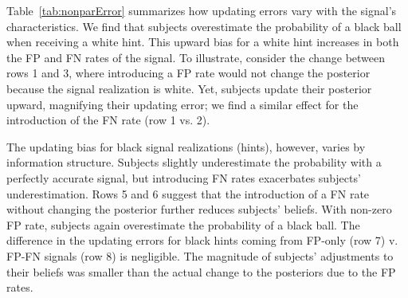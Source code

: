 \documentclass[12pt,a4paper]{article}
\begin{document}
\begin{table}[H]\centering 
\caption{Average Updating Error by Signal Type} 
\label{tab:nonparError}
\end{table}



Table~\ref{tab:nonparError} summarizes how updating errors vary with the signal's characteristics. We find that subjects overestimate the probability of a black ball when receiving a white hint. This upward bias for a white hint increases in both the FP and FN rates of the signal. To illustrate, consider the change between rows 1 and 3, where introducing a FP rate would not change the posterior because the signal realization is white. Yet, subjects update their posterior upward, magnifying their updating error; we find a similar effect for the introduction of the FN rate (row 1 vs. 2).

The updating bias for black signal realizations (hints), however, varies by information structure. Subjects slightly underestimate the probability with a perfectly accurate signal, but introducing FN rates exacerbates subjects' underestimation. Rows 5 and 6 suggest that the introduction of a FN rate without changing the posterior further reduces subjects' beliefs. With non-zero FP rate, subjects again overestimate the probability of a black ball. The difference in the updating errors for black hints coming from FP-only (row 7) v. FP-FN signals (row 8) is negligible. 
The magnitude of subjects' adjustments to their beliefs was smaller than the actual change to the posteriors due to the FP rates.
\end{document}
